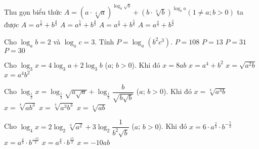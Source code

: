 \begin{ex}%
	Thu gọn biểu thức $A=\left(a\cdot\sqrt[4]{a}\right)^{\log_a\sqrt{b}}+\left(b\cdot\sqrt[3]{b}\right)^{\log_ba}(1\neq a;b>0)$ ta được
	\choice
	{$A=a^{\tfrac{5}{8}}+b^{\tfrac{4}{3}}$}
	{$A=a^{\tfrac{5}{4}}+b^{\tfrac{4}{3}}$}
	{\True $A=a^{\tfrac{4}{3}}+b^{\tfrac{5}{8}}$}
	{$A=a^{\tfrac{4}{3}}+b^{\tfrac{5}{2}}$}
\end{ex}

\begin{ex}%
	Cho $\log_ab=2$ và $\log_ac=3$. Tính $P=\log_a\left(b^2c^3\right)$.
	\choice
	{$P=108$}
	{\True $P=13$}
	{$P=31$}
	{$P=30$}
\end{ex}

\begin{ex}%
	Cho $\log_3x=4\log_3a+2\log_3b$ ($a$; $b>0$). Khi đó
	\choice
	{$x=8ab$}
	{$x=a^4+b^2$}
	{$x=\sqrt{a^2b}$}
	{\True $x=a^4b^2$}
\end{ex}

\begin{ex}%
	Cho $\log_{\tfrac{1}{3}}x=\log_{\tfrac{1}{3}}\sqrt{a\sqrt{a}}+\log_{\tfrac{1}{3}}\dfrac{b}{\sqrt{b\sqrt{b}}}$ ($a$; $b>0$). Khi đó
	\choice
	{\True $x=\sqrt[4]{a^3b}$}
	{$x=\sqrt[4]{ab^3}$}
	{$x=\sqrt[4]{a^3b^3}$}
	{$x=\sqrt[4]{ab}$}
\end{ex}

\begin{ex}%
	Cho $\log_4x=2\log_2\sqrt[3]{a^2}+3\log_2\dfrac{1}{b^2\sqrt{b}}$ ($a$; $b>0$). Khi đó 
	\choice
	{$x=6\cdot a^{\tfrac{2}{3}}\cdot b^{-\tfrac{5}{2}}$}
	{\True $x=a^{\tfrac{4}{3}}\cdot b^{\tfrac{-15}{2}}$}
	{$x=a^{\tfrac{4}{3}}\cdot b^{\tfrac{15}{2}}$}
	{$x=-10ab$}
\end{ex}

